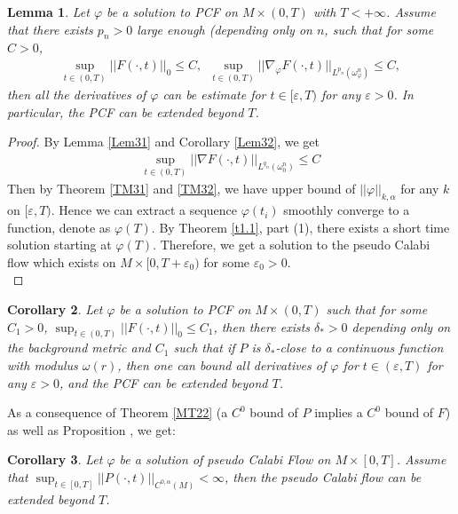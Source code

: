 \documentclass[11pt]{amsart}
\newtheorem{lem}{Lemma}[section]
\newtheorem{cor}[lem]{Corollary}
\numberwithin{equation}{section}
\newcommand \eps{\varepsilon}
\begin{document}
\begin{lem}\label{l4.6N}
Let $\varphi$ be a solution to PCF on $M\times (0,T)$ with $T<+\infty$.  Assume that there exists $p_n>0$ large enough (depending only on $n$,  such that for some $C>0$,  
\begin{align}
	\sup_{t\in (0,T)}||F(\cdot,t)||_0\le  C,\,\,\,\sup_{t\in (0,T)}||\nabla_{\varphi}F(\cdot,t)||_{L^{p_n}(\omega_{\varphi}^n)}\le  C, 
\end{align}
then all the derivatives of $\varphi$ can be estimate for $t\in[\eps ,T)$ for any $\eps >0$.  In particular,  the PCF can be extended beyond $T$. 
\end{lem}

\begin{proof}
	By Lemma \ref{Lem31} and Corollary \ref{Lem32}, we get 
	\begin{align}
		\sup_{t\in (0,T)}||\nabla F(\cdot,t)||_{L^{q_n}(\omega_{0}^n)}\le  C
	\end{align}
	Then by Theorem \ref{TM31} and \ref{TM32}, we have upper bound of $||\varphi||_{k,\alpha}$ for any $k$ on $[\eps,T)$. Hence we can extract a sequence $\varphi(t_i)$ smoothly converge to a function, denote as $\varphi(T)$. By Theorem \ref{t1.1},  part (1),  there exists a short time solution starting at $\varphi(T)$.  Therefore,  we get a solution to the pseudo Calabi flow which exists on $M\times [0,T+\eps_0)$ for some $\eps_0>0$.\\
\end{proof}

\begin{cor}\label{Cor31}
	 Let $\varphi$ be a solution to PCF on $M\times (0,T)$ such that for some $C_1>0$, $\sup_{t\in (0,T)}||F(\cdot,t)||_0\le C_1$,  then there exists $\delta_*>0$ depending only on the background metric and $C_1$ such that if $P$ is $\delta_*$-close to a continuous function with modulus $\omega(r)$,  then one can bound all derivatives of $\varphi$ for $t\in (\eps ,T)$ for any $\eps >0$,  and the PCF can be extended beyond $T$.\\ 
\end{cor}



As a consequence of Theorem \ref{MT22} (a $C^0$ bound of $P$ implies a $C^0$ bound of $F$) as well as Proposition \label{prop:geodesic-mollifier},  we get:

\begin{cor}\label{Cor32}
	Let $\varphi$ be a solution of pseudo Calabi Flow on $M\times [0,T]$.  Assume that $\sup_{t\in [0,T]}||P(\cdot,t)||_{C^{0,\alpha}(M)}<\infty$,  then the pseudo Calabi flow can be extended beyond $T$.
\end{cor}
\end{document}

